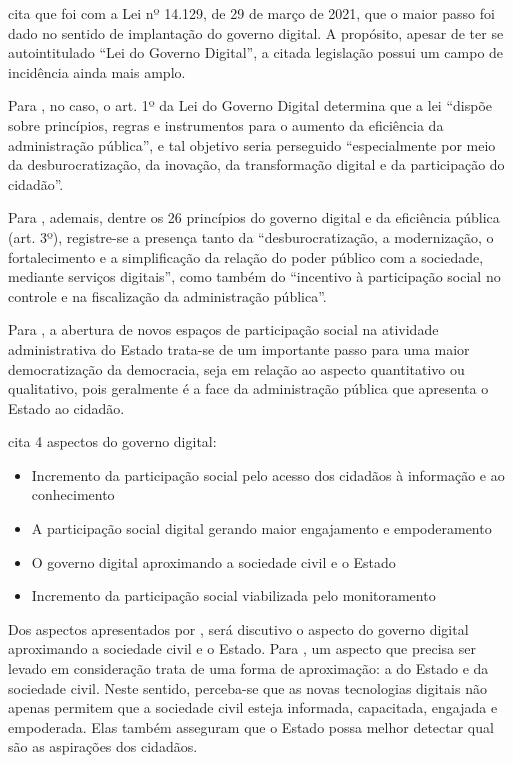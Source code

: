 \cite{carvalho2022nova} cita que foi com a Lei nº 14.129, de 29 de março de 2021, que o maior passo foi dado no sentido de implantação do governo digital. A propósito, apesar de ter se autointitulado “Lei do Governo Digital”, a citada legislação possui um campo de incidência ainda mais amplo.

Para \cite{carvalho2022nova}, no caso, o art. 1º da Lei do Governo Digital determina que a lei “dispõe sobre princípios, regras e instrumentos para o aumento da eficiência da administração pública”, e tal objetivo seria perseguido “especialmente por meio da desburocratização, da inovação, da  transformação digital e da participação do cidadão”. 

Para \cite{carvalho2022nova}, ademais, dentre os 26 princípios do governo digital e da eficiência pública (art. 3º), registre-se a presença tanto da “desburocratização, a modernização, o fortalecimento e a simplificação da relação do poder público com a sociedade, mediante serviços digitais”, como também do “incentivo à participação social no controle e na fiscalização da administração pública”.

Para \cite{carvalho2022nova}, a abertura de novos espaços de participação social na atividade administrativa do Estado trata-se de um importante passo para uma maior democratização da democracia, seja em relação ao aspecto quantitativo ou qualitativo, pois geralmente é a face da administração pública que apresenta o Estado ao cidadão.

\cite{carvalho2022nova} cita 4 aspectos do governo digital: 

\begin{itemize}
	\item Incremento da participação social pelo acesso dos 
cidadãos à informação e ao conhecimento
	\item A participação social digital gerando maior engajamento e 
empoderamento
	\item O governo digital aproximando a sociedade civil e o Estado
	\item Incremento da participação social viabilizada pelo monitoramento
\end{itemize}

Dos aspectos apresentados por \cite{carvalho2022nova}, será discutivo o aspecto do governo digital aproximando a sociedade civil e o Estado. Para \cite{carvalho2022nova}, um aspecto que precisa ser levado em consideração trata de uma forma de aproximação: a do Estado e da sociedade civil. Neste sentido, perceba-se que as novas tecnologias digitais não apenas permitem que a sociedade civil esteja informada, capacitada, engajada e empoderada. Elas também asseguram que o Estado possa melhor detectar qual são as aspirações dos cidadãos.

